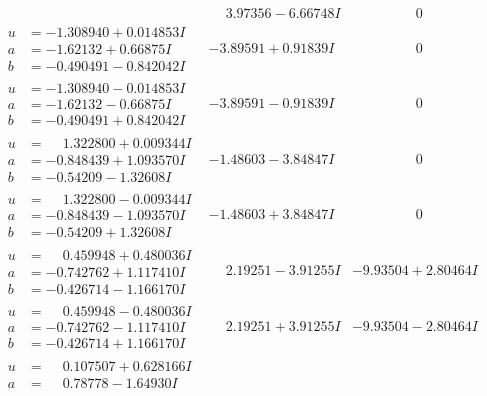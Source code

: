 \documentclass[1p]{elsarticle_modified}
\theoremstyle{definition}
\begin{document}
$$\begin{array}{c|c|c}
 & \phantom{-}3.97356 - 6.66748 I & \phantom{-0.000000 } 0 \\ \hline\begin{aligned}
u &= -1.308940 + 0.014853 I \\
a &= -1.62132 + 0.66875 I \\
b &= -0.490491 - 0.842042 I\end{aligned}
 & -3.89591 + 0.91839 I & \phantom{-0.000000 } 0 \\ \hline\begin{aligned}
u &= -1.308940 - 0.014853 I \\
a &= -1.62132 - 0.66875 I \\
b &= -0.490491 + 0.842042 I\end{aligned}
 & -3.89591 - 0.91839 I & \phantom{-0.000000 } 0 \\ \hline\begin{aligned}
u &= \phantom{-}1.322800 + 0.009344 I \\
a &= -0.848439 + 1.093570 I \\
b &= -0.54209 - 1.32608 I\end{aligned}
 & -1.48603 - 3.84847 I & \phantom{-0.000000 } 0 \\ \hline\begin{aligned}
u &= \phantom{-}1.322800 - 0.009344 I \\
a &= -0.848439 - 1.093570 I \\
b &= -0.54209 + 1.32608 I\end{aligned}
 & -1.48603 + 3.84847 I & \phantom{-0.000000 } 0 \\ \hline\begin{aligned}
u &= \phantom{-}0.459948 + 0.480036 I \\
a &= -0.742762 + 1.117410 I \\
b &= -0.426714 - 1.166170 I\end{aligned}
 & \phantom{-}2.19251 - 3.91255 I & -9.93504 + 2.80464 I \\ \hline\begin{aligned}
u &= \phantom{-}0.459948 - 0.480036 I \\
a &= -0.742762 - 1.117410 I \\
b &= -0.426714 + 1.166170 I\end{aligned}
 & \phantom{-}2.19251 + 3.91255 I & -9.93504 - 2.80464 I \\ \hline\begin{aligned}
u &= \phantom{-}0.107507 + 0.628166 I \\
a &= \phantom{-}0.78778 - 1.64930 I \\

\end{aligned}
\end{array}$$
\end{document}
